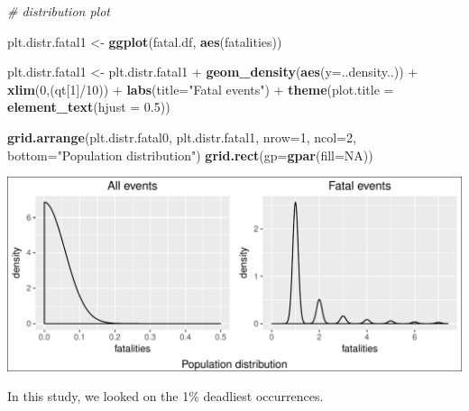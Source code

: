 \documentclass[]{article}
\newenvironment{Shaded}{\begin{snugshade}}{\end{snugshade}}
\newcommand{\KeywordTok}[1]{\textcolor[rgb]{0.13,0.29,0.53}{\textbf{{#1}}}}
\newcommand{\DataTypeTok}[1]{\textcolor[rgb]{0.13,0.29,0.53}{{#1}}}
\newcommand{\DecValTok}[1]{\textcolor[rgb]{0.00,0.00,0.81}{{#1}}}
\newcommand{\FloatTok}[1]{\textcolor[rgb]{0.00,0.00,0.81}{{#1}}}
\newcommand{\StringTok}[1]{\textcolor[rgb]{0.31,0.60,0.02}{{#1}}}
\newcommand{\CommentTok}[1]{\textcolor[rgb]{0.56,0.35,0.01}{\textit{{#1}}}}
\newcommand{\OtherTok}[1]{\textcolor[rgb]{0.56,0.35,0.01}{{#1}}}
\newcommand{\NormalTok}[1]{{#1}}
\begin{document}
\begin{Shaded}
\begin{Highlighting}[]
\CommentTok{# distribution plot}
 
\NormalTok{plt.distr.fatal1 <-}\StringTok{ }\KeywordTok{ggplot}\NormalTok{(fatal.df, }\KeywordTok{aes}\NormalTok{(fatalities))}

\NormalTok{plt.distr.fatal1 <-}\StringTok{ }\NormalTok{plt.distr.fatal1 +}\StringTok{ }\KeywordTok{geom_density}\NormalTok{(}\KeywordTok{aes}\NormalTok{(}\DataTypeTok{y=}\NormalTok{..density..)) +}\StringTok{ }
\StringTok{        }\KeywordTok{xlim}\NormalTok{(}\DecValTok{0}\NormalTok{,(qt[}\DecValTok{1}\NormalTok{]/}\DecValTok{10}\NormalTok{)) +}\StringTok{ }
\StringTok{        }\KeywordTok{labs}\NormalTok{(}\DataTypeTok{title=}\StringTok{"Fatal events"}\NormalTok{) +}
\StringTok{        }\KeywordTok{theme}\NormalTok{(}\DataTypeTok{plot.title =} \KeywordTok{element_text}\NormalTok{(}\DataTypeTok{hjust =} \FloatTok{0.5}\NormalTok{))}
\end{Highlighting}
\end{Shaded}

\begin{Shaded}
\begin{Highlighting}[]
\KeywordTok{grid.arrange}\NormalTok{(plt.distr.fatal0, plt.distr.fatal1, }\DataTypeTok{nrow=}\DecValTok{1}\NormalTok{, }\DataTypeTok{ncol=}\DecValTok{2}\NormalTok{, }
             \DataTypeTok{bottom=}\StringTok{"Population distribution"}\NormalTok{)}
\KeywordTok{grid.rect}\NormalTok{(}\DataTypeTok{gp=}\KeywordTok{gpar}\NormalTok{(}\DataTypeTok{fill=}\OtherTok{NA}\NormalTok{))}
\end{Highlighting}
\end{Shaded}

\includegraphics{readme_files/figure-latex/fatal-distr-4-1.pdf}

In this study, we looked on the 1\% deadliest occurrences.
\end{document}
